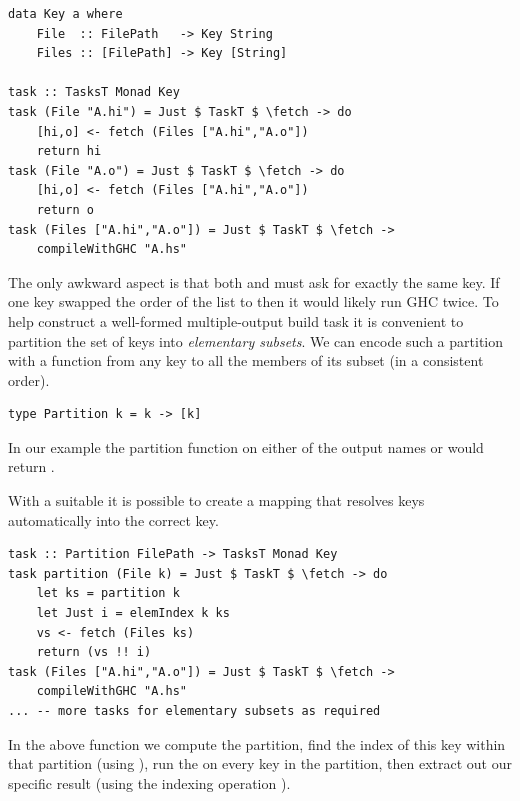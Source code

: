 \vspace{1mm}
\begin{verbatim}
data Key a where
    File  :: FilePath   -> Key String
    Files :: [FilePath] -> Key [String]

task :: TasksT Monad Key
task (File "A.hi") = Just $ TaskT $ \fetch -> do
    [hi,o] <- fetch (Files ["A.hi","A.o"])
    return hi
task (File "A.o") = Just $ TaskT $ \fetch -> do
    [hi,o] <- fetch (Files ["A.hi","A.o"])
    return o
task (Files ["A.hi","A.o"]) = Just $ TaskT $ \fetch ->
    compileWithGHC "A.hs"
\end{verbatim}
\vspace{1mm}

The only awkward aspect is that both  and  must ask for
exactly the same  key. If one  key swapped the order of the
list to  then it would likely run GHC twice. To help construct a
well-formed multiple-output build task it is convenient to partition the set of
keys into \emph{elementary subsets}. We can encode such a partition with a
function from any key to all the members of its subset (in a consistent order).

\vspace{1mm}
\begin{verbatim}
type Partition k = k -> [k]
\end{verbatim}
\vspace{1mm}

\noindent
In our example the partition function on either of the output names 
or  would return \hs{["A.hi","A.o"]}.

With a suitable  it is possible to create a mapping that resolves
 keys automatically into the correct  key.

\vspace{1mm}
\begin{verbatim}
task :: Partition FilePath -> TasksT Monad Key
task partition (File k) = Just $ TaskT $ \fetch -> do
    let ks = partition k
    let Just i = elemIndex k ks
    vs <- fetch (Files ks)
    return (vs !! i)
task (Files ["A.hi","A.o"]) = Just $ TaskT $ \fetch ->
    compileWithGHC "A.hs"
... -- more tasks for elementary subsets as required
\end{verbatim}
\vspace{1mm}

In the above function we compute the partition, find the index of this key within that
partition (using ), run the  on every key in the partition,
then extract out our specific result (using the indexing operation \hs{!!}).

